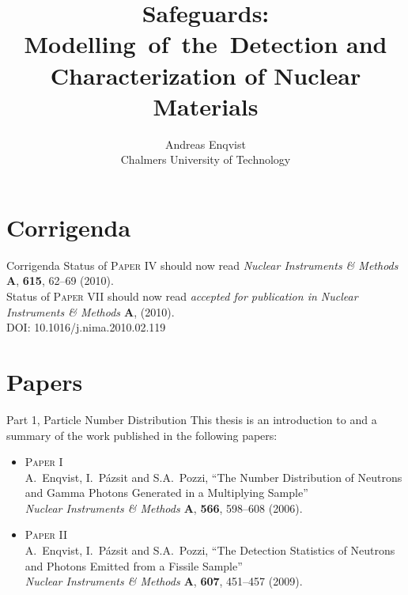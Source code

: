 \documentclass[clock,style=horatio,paper=screen,blackslide,trans=Wipe,mode=present]{powerdot}
\title{\vspace{-1cm}Safeguards: Modelling~of~the~Detection and Characterization of Nuclear Materials  \vspace{-0.3cm}}
\author{  Andreas Enqvist \\ Chalmers University of Technology}
\date{}
\begin{document}
\maketitle[{logohook=t, logopos={0.5\slidewidth,
0.55\slideheight},
logocmd={\texttt{[image: figures/frontpage.eps]}}}]

\section[slide=false]{Corrigenda}
\begin{slide}{Corrigenda}
Status of \textsc{Paper IV} should now read \emph{Nuclear
Instruments \& Methods $\boldsymbol{A}$}, \textbf{615}, 62--69
(2010). \\[4mm]

Status of \textsc{Paper VII} should now read \emph{accepted for
publication in Nuclear Instruments \& Methods $\boldsymbol{A}$},
(2010). \\ DOI:   10.1016/j.nima.2010.02.119
\end{slide}

\section[slide=false]{Papers}

\begin{slide}{Part 1, Particle Number Distribution}
This thesis is an introduction to and a summary of the work
published in the following papers:
\begin{itemize}
\item \textsc{Paper I}\\[1mm] A.~Enqvist, I.~P\'{a}zsit and S.A.~Pozzi, ``The Number Distribution of Neutrons and Gamma Photons Generated in a Multiplying Sample'' \\
\emph{Nuclear Instruments \& Methods $\boldsymbol{A}$}, {\bf
566}, 598--608 (2006).

\item \textsc{Paper II}\\[1mm] A.~Enqvist, I.~P\'{a}zsit and S.A.~Pozzi, ``The Detection Statistics of Neutrons and Photons Emitted from a Fissile Sample''\\
\emph{Nuclear Instruments \& Methods $\boldsymbol{A}$},
\textbf{607}, 451--457 (2009).
\end{itemize}
\end{slide}
\end{document}
